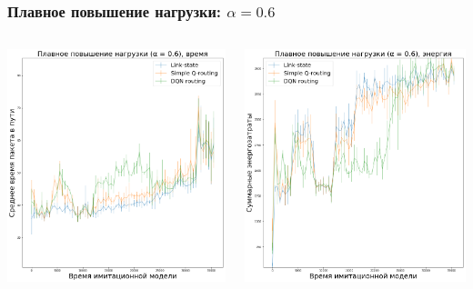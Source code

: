 \documentclass{beamer}
\begin{document}
\begin{frame}
  \frametitle{Плавное повышение нагрузки: $\alpha = 0.6$}
  \begin{columns}
    \begin{column}{0.5\textwidth}
      \includegraphics[width=\textwidth]{experiment-conveyors-a06-time-tall}
    \end{column}
    \begin{column}{0.5\textwidth}
      \includegraphics[width=\textwidth]{experiment-conveyors-a06-energy-tall}
    \end{column}
  \end{columns}
\end{frame}
\end{document}
